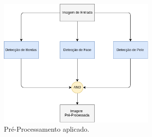 \begin{figure}[H]
	\centering
	\includegraphics[width=0.7\textwidth]{./Resources/pre_processamento.png}
	\caption{Pré-Processamento aplicado.}
	\label{fig:pre_proc}
\end{figure}

